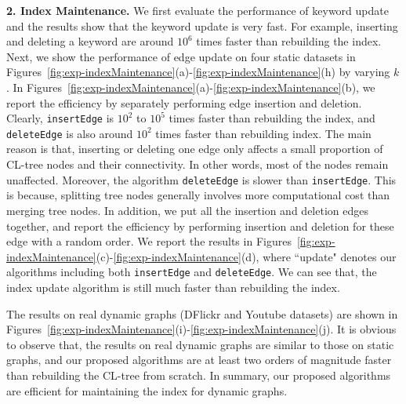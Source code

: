 {\color{blue}
\textbf{2. Index Maintenance.}
We first evaluate the performance of keyword update and the results show that the keyword update is very fast. For example, inserting and deleting a keyword are around $10^6$ times faster than rebuilding the index.
Next, we show the performance of edge update on four static datasets in Figures~\ref{fig:exp-indexMaintenance}(a)-\ref{fig:exp-indexMaintenance}(h) by varying $k$.
In Figures~\ref{fig:exp-indexMaintenance}(a)-\ref{fig:exp-indexMaintenance}(b), we report the efficiency by separately performing edge insertion and deletion. Clearly, {\tt insertEdge} is $10^2$ to $10^5$ times faster than rebuilding the index,
and {\tt deleteEdge} is also around $10^2$ times faster than rebuilding index.
The main reason is that, inserting or deleting one edge only affects a small proportion of CL-tree nodes and their connectivity.
In other words, most of the nodes remain unaffected.
Moreover, the algorithm {\tt deleteEdge} is slower than {\tt insertEdge}. This is because, splitting tree nodes generally involves more computational cost than merging tree nodes.
In addition, we put all the insertion and deletion edges together, and report the efficiency by performing insertion and deletion for these edge with a random order. We report the results in Figures~\ref{fig:exp-indexMaintenance}(c)-\ref{fig:exp-indexMaintenance}(d),
where ``update" denotes our algorithms including both {\tt insertEdge} and {\tt deleteEdge}.
We can see that, the index update algorithm is still much faster than rebuilding the index.

The results on real dynamic graphs (DFlickr and Youtube datasets) are shown in Figures~\ref{fig:exp-indexMaintenance}(i)-\ref{fig:exp-indexMaintenance}(j).
It is obvious to observe that, the results on real dynamic graphs are similar to those on static graphs,
and our proposed algorithms are at least two orders of magnitude faster than rebuilding the CL-tree from scratch.
In summary, our proposed algorithms are efficient for maintaining the index for dynamic graphs.

}
